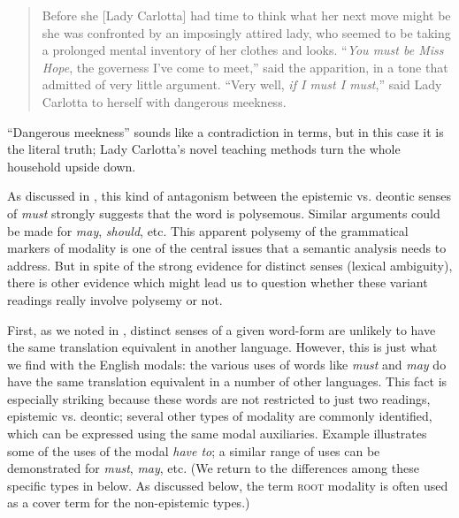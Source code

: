 \begin{quote}
Before she [Lady Carlotta] had time to think what her next move might be she was confronted by an imposingly attired lady, who seemed to be taking a prolonged mental inventory of her clothes and looks. “\textit{You must be Miss Hope}, the governess I’ve come to meet,” said the apparition, in a tone that admitted of very little argument. “Very well, \textit{if I must I must},” said Lady Carlotta to herself with dangerous meekness.
\end{quote}


“Dangerous meekness” sounds like a contradiction in terms, but in this case it is the literal truth; Lady Carlotta’s novel teaching methods turn the whole household upside down.



As discussed in , this kind of antagonism between the epistemic vs. deontic senses of \textit{must} strongly suggests that the word is polysemous. Similar arguments could be made for \textit{may}, \textit{should}, etc. This apparent polysemy of the grammatical markers of modality is one of the central issues that a semantic analysis needs to address. But in spite of the strong evidence for distinct senses (lexical ambiguity), there is other evidence which might lead us to question whether these variant readings really involve polysemy or not.



First, as we noted in , distinct senses of a given word-form are unlikely to have the same translation equivalent in another language. However, this is just what we find with the English modals: the various uses of words like \textit{must} and \textit{may} do have the same translation equivalent in a number of other languages. This fact is especially striking because these words are not restricted to just two readings, epistemic vs. deontic; several other types of modality are commonly identified, which can be expressed using the same modal auxiliaries. Example  illustrates some of the uses of the modal \textit{have to}; a similar range of uses can be demonstrated for \textit{must}, \textit{may}, etc. (We return to the differences among these specific types in  below. As discussed below, the term \textsc{root} modality is often used as a cover term for the non-epistemic types.)


